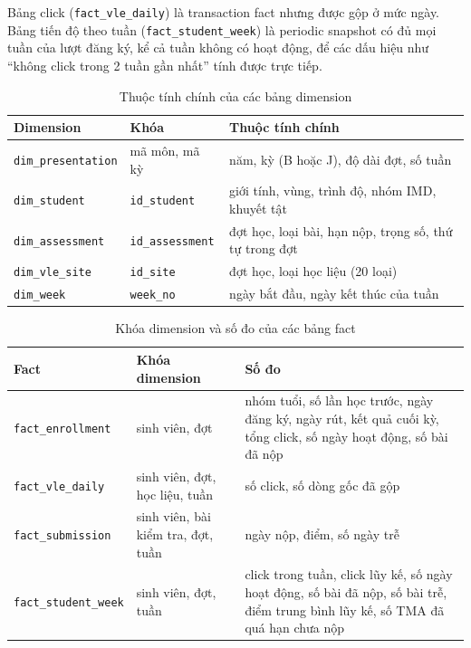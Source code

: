 Bảng click (\texttt{fact\_vle\_daily}) là transaction fact nhưng được gộp ở mức ngày. Bảng tiến độ theo tuần (\texttt{fact\_student\_week}) là periodic snapshot có đủ mọi tuần của lượt đăng ký, kể cả tuần không có hoạt động, để các dấu hiệu như ``không click trong 2 tuần gần nhất'' tính được trực tiếp.

\begin{table}[htbp]
\centering
\small
\begin{tabularx}{\textwidth}{|l|l|X|}
\hline
\textbf{Dimension} & \textbf{Khóa} & \textbf{Thuộc tính chính} \\ \hline
\texttt{dim\_presentation} & mã môn, mã kỳ & năm, kỳ (B hoặc J), độ dài đợt, số tuần \\ \hline
\texttt{dim\_student} & \texttt{id\_student} & giới tính, vùng, trình độ, nhóm IMD, khuyết tật \\ \hline
\texttt{dim\_assessment} & \texttt{id\_assessment} & đợt học, loại bài, hạn nộp, trọng số, thứ tự trong đợt \\ \hline
\texttt{dim\_vle\_site} & \texttt{id\_site} & đợt học, loại học liệu (20 loại) \\ \hline
\texttt{dim\_week} & \texttt{week\_no} & ngày bắt đầu, ngày kết thúc của tuần \\ \hline
\end{tabularx}
\caption{Thuộc tính chính của các bảng dimension}
\label{tab:thuoc-tinh-dim}
\end{table}

\begin{table}[htbp]
\centering
\small
\begin{tabularx}{\textwidth}{|l|p{4.2cm}|X|}
\hline
\textbf{Fact} & \textbf{Khóa dimension} & \textbf{Số đo} \\ \hline
\texttt{fact\_enrollment} & sinh viên, đợt & nhóm tuổi, số lần học trước, ngày đăng ký, ngày rút, kết quả cuối kỳ, tổng click, số ngày hoạt động, số bài đã nộp \\ \hline
\texttt{fact\_vle\_daily} & sinh viên, đợt, học liệu, tuần & số click, số dòng gốc đã gộp \\ \hline
\texttt{fact\_submission} & sinh viên, bài kiểm tra, đợt, tuần & ngày nộp, điểm, số ngày trễ \\ \hline
\texttt{fact\_student\_week} & sinh viên, đợt, tuần & click trong tuần, click lũy kế, số ngày hoạt động, số bài đã nộp, số bài trễ, điểm trung bình lũy kế, số TMA đã quá hạn chưa nộp \\ \hline
\end{tabularx}
\caption{Khóa dimension và số đo của các bảng fact}
\label{tab:so-do-fact}
\end{table}

